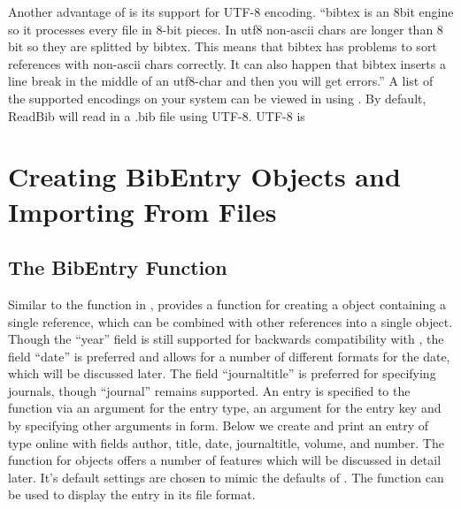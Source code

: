 \documentclass[article]{jss}\usepackage[]{graphicx}\usepackage[]{color}
\newcommand{\ourpkg}{\pkg{RefManageR}}
\begin{document}
Another advantage of \Biblatex{} is its support for UTF-8 encoding. ``bibtex is an 8bit engine so it processes every file in 8-bit pieces. In utf8 non-ascii chars are longer than 8 bit so they are splitted by bibtex. This means that bibtex has problems to sort references with non-ascii chars correctly. It can also happen that bibtex inserts a line break in the middle of an utf8-char and then you will get errors.''  A list of the supported encodings on your system can be viewed in  using .  By default, ReadBib will read in a .bib file using UTF-8.  UTF-8 is  
\section{Creating BibEntry Objects and Importing From Files}
\subsection{The BibEntry Function}
Similar to the  function in , \ourpkg{} provides a function  for creating a  object containing a single reference, which can be combined with other references into a single  object.  Though the ``year'' field is still supported for backwards compatibility with \Bibtex{}, the field ``date'' is preferred and allows for a number of different formats for the date, which will be discussed later.  The field ``journaltitle'' is preferred for specifying journals, though ``journal'' remains supported.  An entry is specified to the  function via an argument  for the entry type, an argument  for the entry key and by specifying other arguments
in  form.  Below we create and print an entry of type online with fields author, title, date, journaltitle, volume, and number.  The  function for  objects offers a number of features which will be discussed in detail later.  It's default settings are chosen to mimic the defaults of \Biblatex{}.  The  function can be used to display the entry in its  file format.
\end{document}
